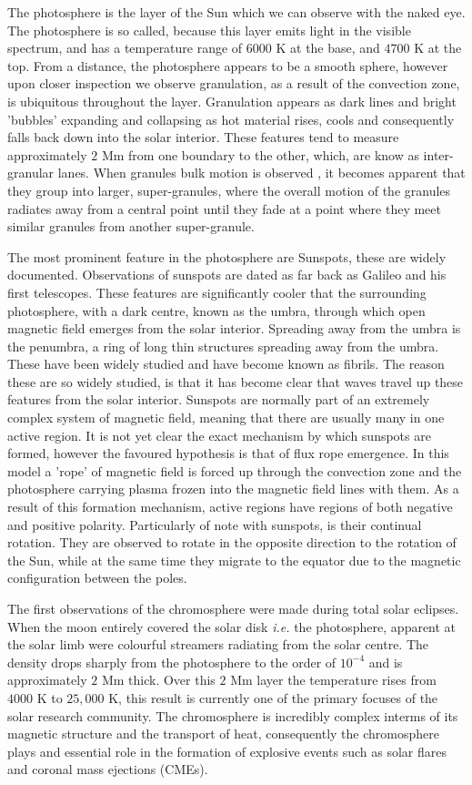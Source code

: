 The photosphere is the layer of the Sun which we can observe with the naked eye.
The photosphere is so called, because this layer emits light in the visible spectrum, and has a temperature range of $6000$ K at the base, and $4700$ K at the top. 
From a distance, the photosphere appears to be a smooth sphere, however upon closer inspection we observe granulation, as a result of the convection zone, is ubiquitous throughout the layer.
Granulation appears as dark lines and bright 'bubbles' expanding and collapsing as hot material rises, cools and consequently falls back down into the solar interior.
These features tend to measure approximately $2$ Mm from one boundary to the other, which, are know as inter-granular lanes.
When granules bulk motion is observed , it becomes apparent that they group into larger, super-granules, where the overall motion of the granules radiates away from a central point until they fade at a point where they meet similar granules from another super-granule.

The most prominent feature in the photosphere are Sunspots, these are widely documented.
Observations of sunspots are dated as far back as Galileo and his first telescopes.
These features are significantly cooler that the surrounding photosphere, with a dark centre, known as the umbra, through which open magnetic field emerges from the solar interior.
Spreading away from the umbra is the penumbra, a ring of long thin structures spreading away from the umbra.
These have been widely studied and have become known as fibrils.
The reason these are so widely studied, is that it has become clear that waves travel up these features from the solar interior.
Sunspots are normally part of an extremely complex system of magnetic field, meaning that there are usually many in one active region.
It is not yet clear the exact mechanism by which sunspots are formed, however the favoured hypothesis is that of flux rope emergence.
In this model a 'rope' of magnetic field is forced up through the convection zone and the photosphere carrying plasma frozen into the magnetic field lines with them.
As a result of this formation mechanism, active regions have regions of both negative and positive polarity.
Particularly of note with sunspots, is their continual rotation.
They are observed to rotate in the opposite direction to the rotation of the Sun, while at the same time they migrate to the equator due to the magnetic configuration between the poles.


The first observations of the chromosphere were made during total solar eclipses.
When the moon entirely covered the solar disk \emph{i.e.} the photosphere, apparent at the solar limb were colourful streamers radiating from the solar centre.
The density drops sharply from the photosphere to the order of $10^{-4}$ and is approximately $2$ Mm thick. 
Over this $2$ Mm layer the temperature rises from $4000$ K to $25,000$ K, this result is currently one of the primary focuses of the solar research community.
The chromosphere is incredibly complex interms of its magnetic structure and the transport of heat, consequently the chromosphere plays and essential role in the formation of explosive events such as solar flares and coronal mass ejections (CMEs).

